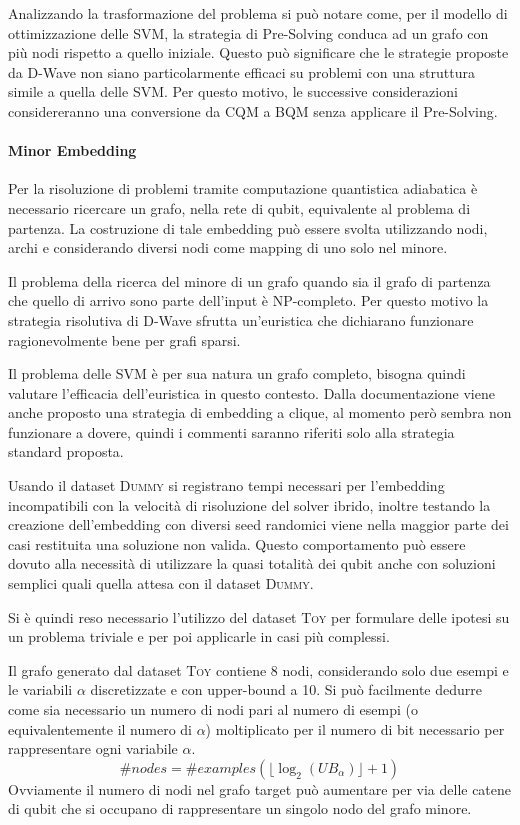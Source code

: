 \documentclass[12pt]{article}
\begin{document}
Analizzando la trasformazione del problema si può notare come, per il modello di ottimizzazione delle SVM, la strategia di Pre-Solving conduca ad un grafo con più nodi rispetto a quello iniziale.
Questo può significare che le strategie proposte da D-Wave non siano particolarmente efficaci su problemi con una struttura simile a quella delle SVM.
Per questo motivo, le successive considerazioni considereranno una conversione da CQM a BQM senza applicare il Pre-Solving.

\paragraph{Minor Embedding}

Per la risoluzione di problemi tramite computazione quantistica adiabatica è necessario ricercare un grafo, nella rete di qubit, equivalente al problema di partenza.
La costruzione di tale embedding può essere svolta utilizzando nodi, archi e considerando diversi nodi come mapping di uno solo nel minore.

Il problema della ricerca del minore di un grafo quando sia il grafo di partenza che quello di arrivo sono parte dell'input è NP-completo.
Per questo motivo la strategia risolutiva di D-Wave sfrutta un'euristica che dichiarano funzionare ragionevolmente bene per grafi sparsi.

Il problema delle SVM è per sua natura un grafo completo, bisogna quindi valutare l'efficacia dell'euristica in questo contesto.
Dalla documentazione viene anche proposto una strategia di embedding a clique, al momento però sembra non funzionare a dovere, quindi i commenti saranno riferiti solo alla strategia standard proposta.

Usando il dataset \textsc{Dummy} si registrano tempi necessari per l'embedding incompatibili con la velocità di risoluzione del solver ibrido,
inoltre testando la creazione dell'embedding con diversi seed randomici viene nella maggior parte dei casi restituita una soluzione non valida.
Questo comportamento può essere dovuto alla necessità di utilizzare la quasi totalità dei qubit anche con soluzioni semplici quali quella attesa con il dataset \textsc{Dummy}.

Si è quindi reso necessario l'utilizzo del dataset \textsc{Toy} per formulare delle ipotesi su un problema triviale e per poi applicarle in casi più complessi.

Il grafo generato dal dataset \textsc{Toy} contiene 8 nodi, considerando solo due esempi e le variabili $\alpha$ discretizzate e con upper-bound a 10.
Si può facilmente dedurre come sia necessario un numero di nodi pari al numero di esempi (o equivalentemente il numero di $\alpha$) moltiplicato per il numero di bit necessario per rappresentare ogni variabile $\alpha$.
$$\#nodes = \#examples (\lfloor\log_2(UB_\alpha)\rfloor+1)$$
Ovviamente il numero di nodi nel grafo target può aumentare per via delle catene di qubit che si occupano di rappresentare un singolo nodo del grafo minore.
\end{document}
